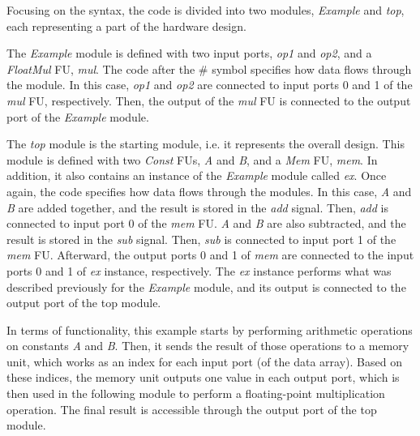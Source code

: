 Focusing on the syntax, the code is divided into two modules, \textit{Example} and \textit{top}, each representing a part of the hardware design.

The \textit{Example} module is defined with two input ports, \textit{op1} and \textit{op2}, and a \textit{FloatMul} FU, \textit{mul}. 
The code after the \# symbol specifies how data flows through the module. In this case, \textit{op1} and \textit{op2} are connected to input ports 0 and 1 of the \textit{mul} FU, respectively.  
Then, the output of the \textit{mul} FU is connected to the output port of the \textit{Example} module.

The \textit{top} module is the starting module, i.e. it represents the overall design.
This module is defined with two \textit{Const} FUs, \textit{A} and \textit{B}, and a \textit{Mem} FU, \textit{mem}. In addition, it also contains an instance of the \textit{Example} module called \textit{ex}. 
Once again, the code specifies how data flows through the modules. In this case, \textit{A} and \textit{B} are added together, and the result is stored in the \textit{add} signal. Then, \textit{add} is connected to input port 0 of the \textit{mem} FU. 
\textit{A} and \textit{B} are also subtracted, and the result is stored in the \textit{sub} signal. Then, \textit{sub} is connected to input port 1 of the \textit{mem} FU.
Afterward, the output ports 0 and 1 of \textit{mem} are connected to the input ports 0 and 1 of \textit{ex} instance, respectively. 
The \textit{ex} instance performs what was described previously for the \textit{Example} module, and its output is connected to the output port of the top module.

In terms of functionality, this example starts by performing arithmetic operations on constants \textit{A} and \textit{B}. Then, it sends the result of those operations to a memory unit, which works as an index for each input port (of the data array). Based on these indices, the memory unit outputs one value in each output port, which is then used in the following module to perform a floating-point multiplication operation. The final result is accessible through the output port of the top module.
